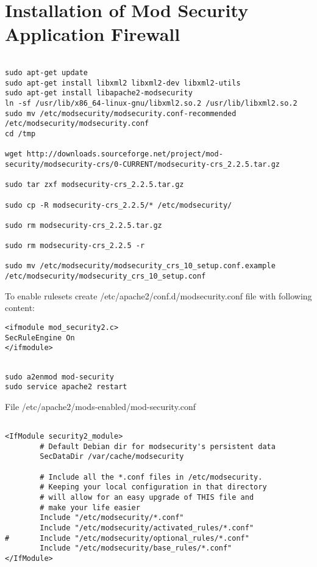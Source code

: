\section{Installation of Mod Security Application Firewall}
\begin{verbatim}

sudo apt-get update
sudo apt-get install libxml2 libxml2-dev libxml2-utils
sudo apt-get install libapache2-modsecurity
ln -sf /usr/lib/x86_64-linux-gnu/libxml2.so.2 /usr/lib/libxml2.so.2
sudo mv /etc/modsecurity/modsecurity.conf-recommended /etc/modsecurity/modsecurity.conf
cd /tmp
 
wget http://downloads.sourceforge.net/project/mod-security/modsecurity-crs/0-CURRENT/modsecurity-crs_2.2.5.tar.gz
 
sudo tar zxf modsecurity-crs_2.2.5.tar.gz
 
sudo cp -R modsecurity-crs_2.2.5/* /etc/modsecurity/
 
sudo rm modsecurity-crs_2.2.5.tar.gz
 
sudo rm modsecurity-crs_2.2.5 -r
 
sudo mv /etc/modsecurity/modsecurity_crs_10_setup.conf.example /etc/modsecurity/modsecurity_crs_10_setup.conf 
\end{verbatim}


To enable rulesets create /etc/apache2/conf.d/modsecurity.conf file with following content:
\begin{verbatim}
<ifmodule mod_security2.c>
SecRuleEngine On
</ifmodule>
\end{verbatim} 
\begin{verbatim}
 
sudo a2enmod mod-security
sudo service apache2 restart

\end{verbatim}


File /etc/apache2/mods-enabled/mod-security.conf
\begin{verbatim}

<IfModule security2_module>
        # Default Debian dir for modsecurity's persistent data
        SecDataDir /var/cache/modsecurity
 
        # Include all the *.conf files in /etc/modsecurity.
        # Keeping your local configuration in that directory
        # will allow for an easy upgrade of THIS file and
        # make your life easier
        Include "/etc/modsecurity/*.conf"
        Include "/etc/modsecurity/activated_rules/*.conf"
#       Include "/etc/modsecurity/optional_rules/*.conf"
        Include "/etc/modsecurity/base_rules/*.conf"
</IfModule>
\end{verbatim} 

